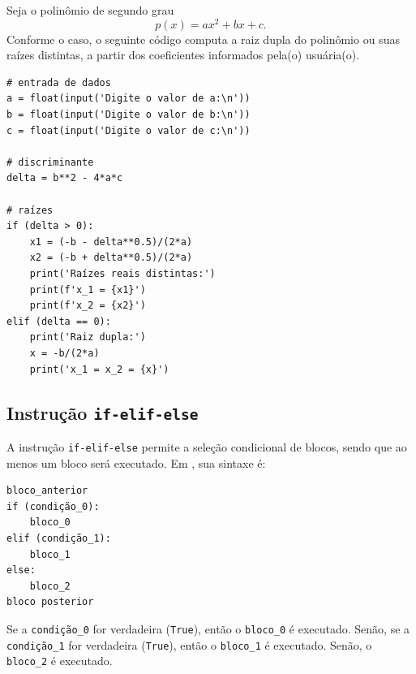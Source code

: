 \begin{ex}
  Seja o polinômio de segundo grau
  \begin{equation}
    p(x) = ax^2 + bx + c.
  \end{equation}
  Conforme o caso, o seguinte código computa a raiz dupla do polinômio ou suas raízes distintas, a partir dos coeficientes informados pela(o) usuária(o).
\begin{lstlisting}
# entrada de dados
a = float(input('Digite o valor de a:\n'))
b = float(input('Digite o valor de b:\n'))
c = float(input('Digite o valor de c:\n'))

# discriminante
delta = b**2 - 4*a*c

# raízes
if (delta > 0):
    x1 = (-b - delta**0.5)/(2*a)
    x2 = (-b + delta**0.5)/(2*a)
    print('Raízes reais distintas:')
    print(f'x_1 = {x1}')
    print(f'x_2 = {x2}')
elif (delta == 0):
    print('Raiz dupla:')
    x = -b/(2*a)
    print('x_1 = x_2 = {x}')
\end{lstlisting}
\end{ex}

\subsection{Instrução \lstinline+if-elif-else+}

A instrução \lstinline+if-elif-else+ permite a seleção condicional de blocos, sendo que ao menos um bloco será executado. Em {\python}, sua sintaxe é:
\begin{lstlisting}
bloco_anterior
if (condição_0):
    bloco_0
elif (condição_1):
    bloco_1
else:
    bloco_2
bloco posterior
\end{lstlisting}
Se a \lstinline+condição_0+ for verdadeira (\lstinline+True+), então o \lstinline+bloco_0+ é executado. Senão, se a \lstinline+condição_1+ for verdadeira (\lstinline+True+), então o \lstinline+bloco_1+ é executado. Senão, o \lstinline+bloco_2+ é executado.

